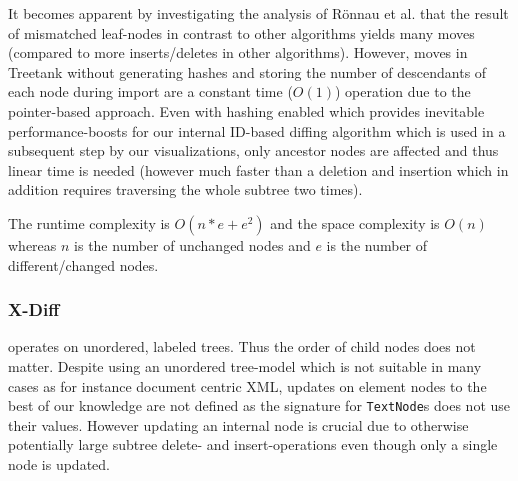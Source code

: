 It becomes apparent by investigating the analysis of Rönnau et al.\cite{ronnau2009efficient} that the result of mismatched leaf-nodes in contrast to other algorithms yields many moves (compared to more inserts/deletes in other algorithms). However, moves in Treetank without generating hashes and storing the number of descendants of each node during import are a constant time ($O(1)$) operation due to the pointer-based approach. Even with hashing enabled which provides inevitable performance-boosts for our internal ID-based diffing algorithm which is used in a subsequent step by our visualizations, only ancestor nodes are affected and thus linear time is needed (however much faster than a deletion and insertion which in addition requires traversing the whole subtree two times).

The runtime complexity is $O(n*e+e^2)$ and the space complexity is $O(n)$ whereas $n$ is the number of unchanged nodes and $e$ is the number of different/changed nodes.

\subsubsection{X-Diff\cite{wang2003x}}
operates on unordered, labeled trees. Thus the order of child nodes does not matter. Despite using an unordered tree-model which is not suitable in many cases as for instance document centric XML, updates on element nodes to the best of our knowledge are not defined as the signature for \texttt{TextNode}s does not use their values. However updating an internal node is crucial due to otherwise potentially large subtree delete- and insert-operations even though only a single node is updated.




